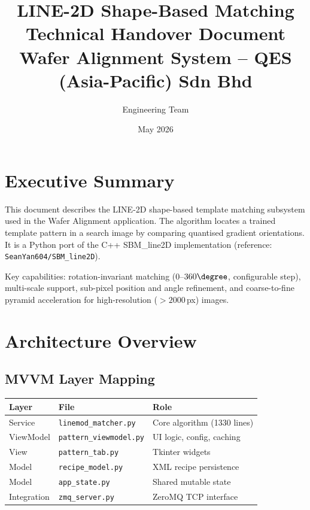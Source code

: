 \documentclass[11pt,a4paper]{article}
\title{\textbf{LINE-2D Shape-Based Matching}\\[4pt]\large Technical Handover Document\\[2pt]\normalsize Wafer Alignment System -- QES (Asia-Pacific) Sdn Bhd}
\author{Engineering Team}\date{May 2026}
\begin{document}
\maketitle\tableofcontents\newpage

\section{Executive Summary}
This document describes the LINE-2D shape-based template matching subsystem used in the Wafer Alignment application. The algorithm locates a trained template pattern in a search image by comparing quantised gradient orientations. It is a Python port of the C++ SBM\_line2D implementation (reference: \texttt{SeanYan604/SBM\_line2D}).

Key capabilities: rotation-invariant matching ($0$--$360\degree$, configurable step), multi-scale support, sub-pixel position and angle refinement, and coarse-to-fine pyramid acceleration for high-resolution ($>2000$\,px) images.

\section{Architecture Overview}

\subsection{MVVM Layer Mapping}
\begin{center}
\begin{tabular}{lll}\toprule
\textbf{Layer} & \textbf{File} & \textbf{Role}\\\midrule
Service & \texttt{linemod\_matcher.py} & Core algorithm (1330 lines)\\
ViewModel & \texttt{pattern\_viewmodel.py} & UI logic, config, caching\\
View & \texttt{pattern\_tab.py} & Tkinter widgets\\
Model & \texttt{recipe\_model.py} & XML recipe persistence\\
Model & \texttt{app\_state.py} & Shared mutable state\\
Integration & \texttt{zmq\_server.py} & ZeroMQ TCP interface\\\bottomrule
\end{tabular}
\end{center}
\end{document}
